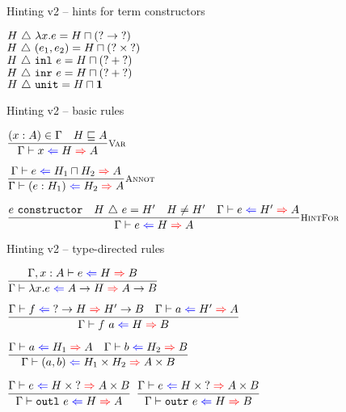 \documentclass{beamer}
\newcommand{\Fun}[2]{#1 \to #2}
\newcommand{\Prod}[2]{#1 \times #2}
\newcommand{\Sum}[2]{#1 + #2}
\newcommand{\Unit}{\textbf{1}}
\newcommand{\annot}[2]{(#1 : #2)}
\newcommand{\fun}[2]{\lambda #1. #2}
\newcommand{\app}[2]{#1\ #2}
\newcommand{\pair}[2]{(#1, #2)}
\newcommand{\outl}[1][]{\texttt{outl}\ #1}
\newcommand{\outr}[1][]{\texttt{outr}\ #1}
\newcommand{\inl}[1][]{\texttt{inl}\ #1}
\newcommand{\inr}[1][]{\texttt{inr}\ #1}
\newcommand{\unit}{\texttt{unit}}
\newcommand{\infrule}[3][]{\displaystyle \frac{#2}{#3} \textsc{\footnotesize{#1}}}
\newcommand{\extend}[3]{#1, #2 : #3}
\newcommand{\sidecond}[1]{#1}
\begin{document}
\begin{frame}{Hinting v2 -- hints for term constructors}

\begin{center}
  $\hintfor{H}{\fun{x}{e}} = \combinehints{H}{(\Fun{\Hint}{\Hint})}$ \\
  $\hintfor{H}{\pair{e_1}{e_2}} = \combinehints{H}{(\Prod{\Hint}{\Hint})}$ \\
  $\hintfor{H}{\inl[e]} = \combinehints{H}{(\Sum{\Hint}{\Hint})}$ \\
  $\hintfor{H}{\inr[e]} = \combinehints{H}{(\Sum{\Hint}{\Hint})}$ \\
  $\hintfor{H}{\unit} = \combinehints{H}{\Unit}$
\end{center}

\end{frame}

\begin{frame}{Hinting v2 -- basic rules}

\begin{center}
  $\infrule[Var]{\sidecond{(x : A) \in \Gamma} \quad \sidecond{\hintorder{H}{A}}}{\hinting{x}{H}{A}}$

  \vspace{2em}

  $\infrule[Annot]{\hinting{e}{\combinehints{H_1}{H_2}}{A}}{\hinting{\annot{e}{H_1}}{H_2}{A}}$

  \vspace{2em}

  $\infrule[HintFor]{\sidecond{e\ \texttt{constructor}} \quad \sidecond{\hintfor{H}{e} = H'} \quad \sidecond{H \neq H'} \quad \hinting{e}{H'}{A}}{\hinting{e}{H}{A}}$
\end{center}
  
\end{frame}

\begin{frame}{Hinting v2 -- type-directed rules}
  
\begin{center}
  $\infrule{\fullhinting{\extend{\Gamma}{x}{A}}{e}{H}{B}}{\hinting{\fun{x}{e}}{\Fun{A}{H}}{\Fun{A}{B}}}$

  \vspace{1em}

  $\infrule{\hinting{f}{\Fun{\Hint}{H}}{\Fun{H'}{B}} \quad \hinting{a}{H'}{A}}{\hinting{\app{f}{a}}{H}{B}}$

  \vspace{1em}

  $\infrule{\hinting{a}{H_1}{A} \quad \hinting{b}{H_2}{B}}{\hinting{\pair{a}{b}}{\Prod{H_1}{H_2}}{\Prod{A}{B}}}$

  \vspace{1em}

  $\infrule{\hinting{e}{\Prod{H}{\Hint}}{\Prod{A}{B}}}{\hinting{\outl[e]}{H}{A}}$ \quad
  $\infrule{\hinting{e}{\Prod{H}{\Hint}}{\Prod{A}{B}}}{\hinting{\outr[e]}{H}{B}}$
\end{center}
  
\end{frame}
  
\end{document}
